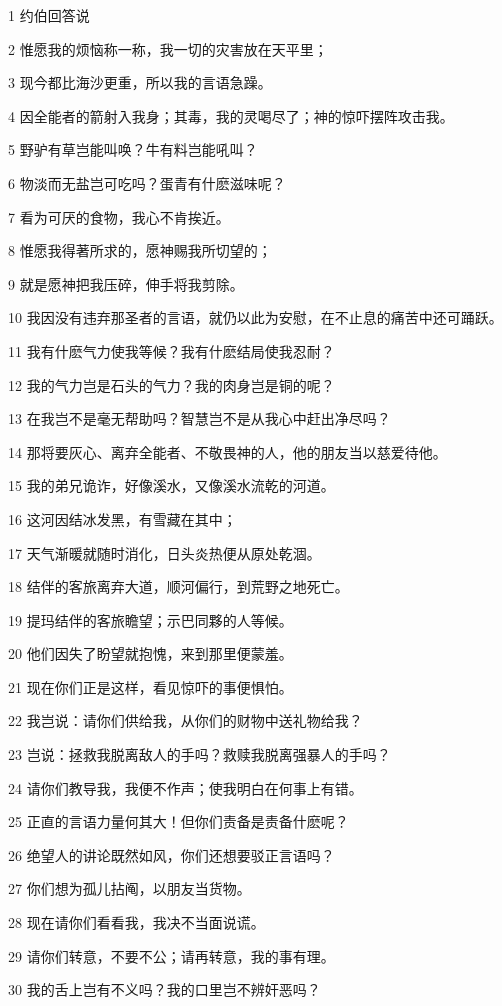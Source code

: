 \par 1 约伯回答说
\par 2 惟愿我的烦恼称一称，我一切的灾害放在天平里；
\par 3 现今都比海沙更重，所以我的言语急躁。
\par 4 因全能者的箭射入我身；其毒，我的灵喝尽了；神的惊吓摆阵攻击我。
\par 5 野驴有草岂能叫唤？牛有料岂能吼叫？
\par 6 物淡而无盐岂可吃吗？蛋青有什麽滋味呢？
\par 7 看为可厌的食物，我心不肯挨近。
\par 8 惟愿我得著所求的，愿神赐我所切望的；
\par 9 就是愿神把我压碎，伸手将我剪除。
\par 10 我因没有违弃那圣者的言语，就仍以此为安慰，在不止息的痛苦中还可踊跃。
\par 11 我有什麽气力使我等候？我有什麽结局使我忍耐？
\par 12 我的气力岂是石头的气力？我的肉身岂是铜的呢？
\par 13 在我岂不是毫无帮助吗？智慧岂不是从我心中赶出净尽吗？
\par 14 那将要灰心、离弃全能者、不敬畏神的人，他的朋友当以慈爱待他。
\par 15 我的弟兄诡诈，好像溪水，又像溪水流乾的河道。
\par 16 这河因结冰发黑，有雪藏在其中；
\par 17 天气渐暖就随时消化，日头炎热便从原处乾涸。
\par 18 结伴的客旅离弃大道，顺河偏行，到荒野之地死亡。
\par 19 提玛结伴的客旅瞻望；示巴同夥的人等候。
\par 20 他们因失了盼望就抱愧，来到那里便蒙羞。
\par 21 现在你们正是这样，看见惊吓的事便惧怕。
\par 22 我岂说：请你们供给我，从你们的财物中送礼物给我？
\par 23 岂说：拯救我脱离敌人的手吗？救赎我脱离强暴人的手吗？
\par 24 请你们教导我，我便不作声；使我明白在何事上有错。
\par 25 正直的言语力量何其大！但你们责备是责备什麽呢？
\par 26 绝望人的讲论既然如风，你们还想要驳正言语吗？
\par 27 你们想为孤儿拈阄，以朋友当货物。
\par 28 现在请你们看看我，我决不当面说谎。
\par 29 请你们转意，不要不公；请再转意，我的事有理。
\par 30 我的舌上岂有不义吗？我的口里岂不辨奸恶吗？

